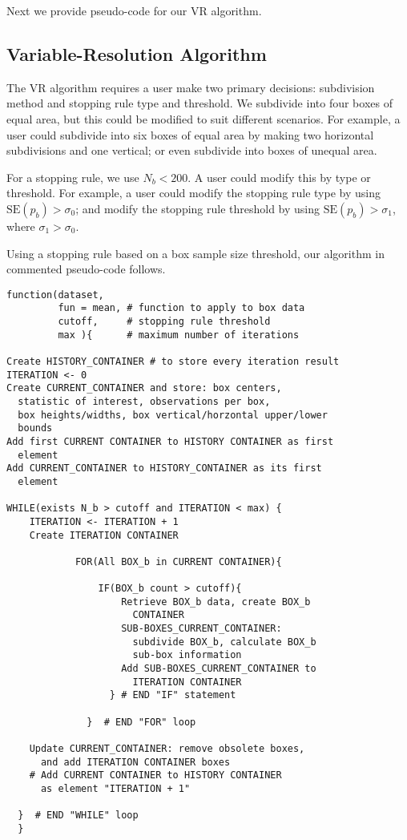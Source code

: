 Next we provide pseudo-code for our VR algorithm.
      	
\subsection{Variable-Resolution Algorithm}

The VR algorithm requires a user make two primary decisions: subdivision method and stopping rule type and threshold. We subdivide into four boxes of equal area, but this could be modified to suit different scenarios. For example, a user could subdivide into six boxes of equal area by making two horizontal subdivisions and one vertical; or even subdivide into boxes of unequal area.

For a stopping rule, we use $N_{b} < 200$. A user could modify this by type or threshold. For example, a user could modify the stopping rule type by using $\text{SE}(p_{b}) > \sigma_{0}$; and modify the stopping rule threshold by using $\text{SE}(p_{b}) > \sigma_{1}$, where $\sigma_{1} > \sigma_{0}$.

Using a stopping rule based on a box sample size threshold, our algorithm in commented pseudo-code follows.
\begin{verbatim}
function(dataset, 
         fun = mean, # function to apply to box data
         cutoff,     # stopping rule threshold
         max ){      # maximum number of iterations
         
Create HISTORY_CONTAINER # to store every iteration result
ITERATION <- 0              
Create CURRENT_CONTAINER and store: box centers, 
  statistic of interest, observations per box, 
  box heights/widths, box vertical/horzontal upper/lower 
  bounds
Add first CURRENT CONTAINER to HISTORY CONTAINER as first
  element
Add CURRENT_CONTAINER to HISTORY_CONTAINER as its first
  element

WHILE(exists N_b > cutoff and ITERATION < max) {
    ITERATION <- ITERATION + 1    
    Create ITERATION CONTAINER
            
            FOR(All BOX_b in CURRENT CONTAINER){
            
                IF(BOX_b count > cutoff){ 
                    Retrieve BOX_b data, create BOX_b
                      CONTAINER
                    SUB-BOXES_CURRENT_CONTAINER: 
                      subdivide BOX_b, calculate BOX_b 
                      sub-box information
                    Add SUB-BOXES_CURRENT_CONTAINER to
                      ITERATION CONTAINER  
                  } # END "IF" statement
                        
              }  # END "FOR" loop
              
    Update CURRENT_CONTAINER: remove obsolete boxes,
      and add ITERATION CONTAINER boxes
    # Add CURRENT CONTAINER to HISTORY CONTAINER 
      as element "ITERATION + 1"
            
  }  # END "WHILE" loop
  }

\end{verbatim}
      	
